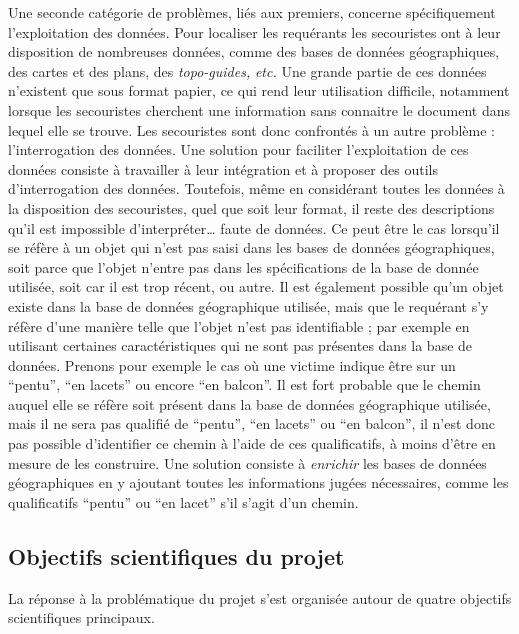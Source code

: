 Une seconde catégorie de problèmes, liés aux premiers, concerne
spécifiquement l'exploitation des données. Pour localiser les
requérants les secouristes ont à leur disposition de nombreuses
données, comme des bases de données géographiques, des cartes et des
plans, des \emph{topo-guides,} \emph{etc.} Une grande partie de ces
données n'existent que sous format papier, ce qui rend leur
utilisation difficile, notamment lorsque les secouristes cherchent une
information sans connaitre le document dans lequel elle se trouve. Les
secouristes sont donc confrontés à un autre problème : l'interrogation
des données. Une solution pour faciliter l'exploitation de ces données
consiste à travailler à leur intégration et à proposer des outils
d'interrogation des données. Toutefois, même en considérant toutes les
données à la disposition des secouristes, quel que soit leur format,
il reste des descriptions qu'il est impossible d'interpréter… faute de
données. Ce peut être le cas lorsqu'il se réfère à un objet qui n'est
pas saisi dans les bases de données géographiques, soit parce que
l'objet n'entre pas dans les spécifications de la base de donnée
utilisée, soit car il est trop récent, ou autre. Il est également
possible qu'un objet existe dans la base de données géographique
utilisée, mais que le requérant s'y réfère d'une manière telle que
l'objet n'est pas identifiable ; par exemple en utilisant certaines
caractéristiques qui ne sont pas présentes dans la base de
données. Prenons pour exemple le cas où une victime indique être sur
un \enquote{pentu}, \enquote{en lacets} ou encore \enquote{en
  balcon}. Il est fort probable que le chemin auquel elle se réfère
soit présent dans la base de données géographique utilisée, mais il ne
sera pas qualifié de \enquote{pentu}, \enquote{en lacets} ou
\enquote{en balcon}, il n'est donc pas possible d'identifier ce chemin
à l'aide de ces qualificatifs, à moins d'être en mesure de les
construire. Une solution consiste à \emph{enrichir} les bases de
données géographiques en y ajoutant toutes les informations jugées
nécessaires, comme les qualificatifs \enquote{pentu} ou \enquote{en
  lacet} s'il s'agit d'un chemin.

\subsection{Objectifs scientifiques du projet}
\label{subsec:1-2-3}

La réponse à la problématique du projet s'est organisée autour de
quatre objectifs scientifiques principaux.

